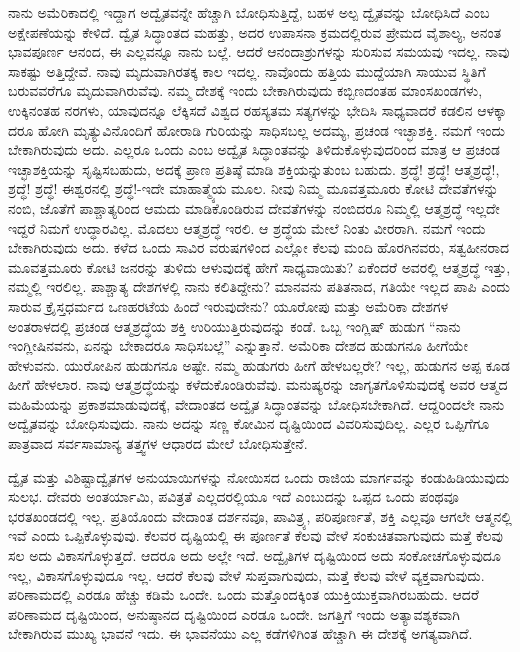 ನಾನು ಅಮೆರಿಕಾದಲ್ಲಿ ಇದ್ದಾಗ ಅದ್ವೈತವನ್ನೇ ಹೆಚ್ಚಾಗಿ ಬೋಧಿಸುತ್ತಿದ್ದೆ, ಬಹಳ ಅಲ್ಪ ದ್ವೈತವನ್ನು ಬೋಧಿಸಿದೆ ಎಂಬ ಅಕ್ಷೇಪಣೆಯನ್ನು ಕೇಳಿದೆ. ದ್ವೈತ ಸಿದ್ಧಾಂತದ ಮಹತ್ತು, ಅದರ ಉಪಾಸನಾ ಕ್ರಮದಲ್ಲಿರುವ ಪ್ರೇಮದ ವೈಶಾಲ್ಯ, ಅನಂತ ಭಾವಪೂರ್ಣ ಆನಂದ, ಈ ಎಲ್ಲವನ್ನೂ ನಾನು ಬಲ್ಲೆ. ಆದರೆ ಆನಂದಾಶ್ರುಗಳನ್ನು ಸುರಿಸುವ ಸಮಯವು ಇದಲ್ಲ. ನಾವು ಸಾಕಷ್ಟು ಅತ್ತಿದ್ದೇವೆ. ನಾವು ಮೃದುವಾಗಿರತಕ್ಕ ಕಾಲ ಇದಲ್ಲ. ನಾವೊಂದು ಹತ್ತಿಯ ಮುದ್ದೆಯಾಗಿ ಸಾಯುವ ಸ್ಥಿತಿಗೆ ಬರುವವರೆಗೂ ಮೃದುವಾಗಿರುವೆವು. ನಮ್ಮ ದೇಶಕ್ಕೆ ಇಂದು ಬೇಕಾಗಿರುವುದು ಕಬ್ಬಿಣದಂತಹ ಮಾಂಸಖಂಡಗಳು, ಉಕ್ಕಿನಂತಹ ನರಗಳು, ಯಾವುದನ್ನೂ ಲೆಕ್ಕಿಸದೆ ವಿಶ್ವದ ರಹಸ್ಯತಮ ಸತ್ಯಗಳನ್ನು ಭೇದಿಸಿ ಸಾಧ್ಯವಾದರೆ ಕಡಲಿನ ಆಳಕ್ಕಾ ದರೂ ಹೋಗಿ ಮೃತ್ಯುವಿನೊಂದಿಗೆ ಹೋರಾಡಿ ಗುರಿಯನ್ನು ಸಾಧಿಸಬಲ್ಲ ಅದಮ್ಯ, ಪ್ರಚಂಡ ಇಚ್ಛಾಶಕ್ತಿ. ನಮಗೆ ಇಂದು ಬೇಕಾಗಿರುವುದು ಅದು. ಎಲ್ಲರೂ ಒಂದು ಎಂಬ ಅದ್ವೈತ ಸಿದ್ಧಾಂತವನ್ನು ತಿಳಿದುಕೊಳ್ಳುವುದರಿಂದ ಮಾತ್ರ ಆ ಪ್ರಚಂಡ ಇಚ್ಛಾಶಕ್ತಿಯನ್ನು ಸೃಷ್ಟಿಸಬಹುದು, ಅದಕ್ಕೆ ಪ್ರಾಣ ಪ್ರತಿಷ್ಠೆ ಮಾಡಿ ಶಕ್ತಿಯನ್ನುತುಂಬ ಬಹುದು. ಶ್ರದ್ಧೆ! ಶ್ರದ್ಧೆ! ಆತ್ಮಶ್ರದ್ಧೆ!, ಶ್ರದ್ಧೆ! ಶ್ರದ್ಧೆ! ಈಶ್ವರನಲ್ಲಿ ಶ್ರದ್ಧೆ!-ಇದೇ ಮಾಹಾತ್ಮ್ಯೆಯ ಮೂಲ. ನೀವು ನಿಮ್ಮ ಮೂವತ್ತಮೂರು ಕೋಟಿ ದೇವತೆಗಳನ್ನು ನಂಬಿ, ಜೊತೆಗೆ ಪಾಶ್ಚಾತ್ಯರಿಂದ ಆಮದು ಮಾಡಿಕೊಂಡಿರುವ ದೇವತೆಗಳನ್ನು ನಂಬಿದರೂ ನಿಮ್ಮಲ್ಲಿ ಆತ್ಮಶ್ರದ್ಧೆ ಇಲ್ಲದೇ ಇದ್ದರೆ ನಿಮಗೆ ಉದ್ಧಾರವಿಲ್ಲ. ಮೊದಲು ಆತ್ಮಶ್ರದ್ಧೆ ಇರಲಿ. ಆ ಶ್ರದ್ಧೆಯ ಮೇಲೆ ನಿಂತು ವೀರರಾಗಿ. ನಮಗೆ ಇಂದು ಬೇಕಾಗಿರುವುದು ಅದು. ಕಳೆದ ಒಂದು ಸಾವಿರ ವರುಷಗಳಿಂದ ಎಲ್ಲೋ ಕೆಲವು ಮಂದಿ ಹೊರಗಿನವರು, ಸತ್ವಹೀನರಾದ ಮೂವತ್ತಮೂರು ಕೋಟಿ ಜನರನ್ನು ತುಳಿದು ಆಳುವುದಕ್ಕೆ ಹೇಗೆ ಸಾಧ್ಯವಾಯಿತು? ಏಕೆಂದರೆ ಅವರಲ್ಲಿ ಆತ್ಮಶ್ರದ್ಧೆ ಇತ್ತು, ನಮ್ಮಲ್ಲಿ ಇರಲಿಲ್ಲ. ಪಾಶ್ಚಾತ್ಯ ದೇಶಗಳಲ್ಲಿ ನಾನು ಕಲಿತಿದ್ದೇನು? ಮಾನವನು ಪತಿತನಾದ, ಗತಿಯೇ ಇಲ್ಲದ ಪಾಪಿ ಎಂದು ಸಾರುವ ಕ್ರೈಸ್ತಧರ್ಮದ ಒಣಹರಟೆಯ ಹಿಂದೆ ಇರುವುದೇನು? ಯೂರೋಪು ಮತ್ತು ಅಮೆರಿಕಾ ದೇಶಗಳ ಅಂತರಾಳದಲ್ಲಿ ಪ್ರಚಂಡ ಆತ್ಮಶ್ರದ್ಧೆಯ ಶಕ್ತಿ ಉರಿಯುತ್ತಿರುವುದನ್ನು ಕಂಡೆ. ಒಬ್ಬ ಇಂಗ್ಲಿಷ್​ ಹುಡುಗ “ನಾನು ಇಂಗ್ಲೀಷಿನವನು, ಏನನ್ನು ಬೇಕಾದರೂ ಸಾಧಿಸಬಲ್ಲೆ” ಎನ್ನುತ್ತಾನೆ. ಅಮೆರಿಕಾ ದೇಶದ ಹುಡುಗನೂ ಹೀಗೆಯೇ ಹೇಳುವನು. ಯುರೋಪಿನ ಹುಡುಗನೂ ಅಷ್ಟೇ. ನಮ್ಮ ಹುಡುಗರು ಹೀಗೆ ಹೇಳಬಲ್ಲರೇ? ಇಲ್ಲ, ಹುಡುಗನ ಅಪ್ಪ ಕೂಡ ಹೀಗೆ ಹೇಳಲಾರ. ನಾವು ಆತ್ಮಶ್ರದ್ಧೆಯನ್ನು ಕಳೆದುಕೊಂಡಿರುವೆವು. ಮನುಷ್ಯರನ್ನು ಜಾಗೃತಗೊಳಿಸುವುದಕ್ಕೆ ಅವರ ಆತ್ಮದ ಮಹಿಮೆಯನ್ನು ಪ್ರಕಾಶಮಾಡುವುದಕ್ಕೆ, ವೇದಾಂತದ ಅದ್ವೈತ ಸಿದ್ಧಾಂತವನ್ನು ಬೋಧಿಸಬೇಕಾಗಿದೆ. ಆದ್ದರಿಂದಲೇ ನಾನು ಅದ್ವೈತವನ್ನು ಬೋಧಿಸುವುದು. ನಾನು ಅದನ್ನು ಸಣ್ಣ ಕೋಮಿನ ದೃಷ್ಟಿಯಿಂದ ವಿವರಿಸುವುದಿಲ್ಲ. ಎಲ್ಲರ ಒಪ್ಪಿಗೆಗೂ ಪಾತ್ರವಾದ ಸರ್ವಸಾಮಾನ್ಯ ತತ್ತ್ವಗಳ ಆಧಾರದ ಮೇಲೆ ಬೋಧಿಸುತ್ತೇನೆ.

ದ್ವೈತ ಮತ್ತು ವಿಶಿಷ್ಟಾದ್ವೈತಗಳ ಅನುಯಾಯಿಗಳನ್ನು ನೋಯಿಸದ ಒಂದು ರಾಜಿಯ ಮಾರ್ಗವನ್ನು ಕಂಡುಹಿಡಿಯುವುದು ಸುಲಭ. ದೇವರು ಅಂತರ್ಯಾಮಿ, ಪವಿತ್ರತೆ ಎಲ್ಲದರಲ್ಲಿಯೂ ಇದೆ ಎಂಬುದನ್ನು ಒಪ್ಪದ ಒಂದು ಪಂಥವೂ ಭರತಖಂಡದಲ್ಲಿ ಇಲ್ಲ. ಪ್ರತಿಯೊಂದು ವೇದಾಂತ ದರ್ಶನವೂ, ಪಾವಿತ್ರ್ಯ, ಪರಿಪೂರ್ಣತೆ, ಶಕ್ತಿ ಎಲ್ಲವೂ ಆಗಲೇ ಆತ್ಮನಲ್ಲಿ ಇವೆ ಎಂದು ಒಪ್ಪಿಕೊಳ್ಳುವುವು. ಕೆಲವರ ದೃಷ್ಟಿಯಲ್ಲಿ ಈ ಪೂರ್ಣತೆ ಕೆಲವು ವೇಳೆ ಸಂಕುಚಿತವಾಗುವುದು ಮತ್ತೆ ಕೆಲವು ಸಲ ಅದು ವಿಕಾಸಗೊಳ್ಳುತ್ತದೆ. ಆದರೂ ಅದು ಅಲ್ಲೇ ಇದೆ. ಅದ್ವೈತಿಗಳ ದೃಷ್ಟಿಯಿಂದ ಅದು ಸಂಕೋಚಗೊಳ್ಳುವುದೂ ಇಲ್ಲ, ವಿಕಾಸಗೊಳ್ಳುವುದೂ ಇಲ್ಲ. ಆದರೆ ಕೆಲವು ವೇಳೆ ಸುಪ್ತವಾಗುವುದು, ಮತ್ತೆ ಕೆಲವು ವೇಳೆ ವ್ಯಕ್ತವಾಗುವುದು. ಪರಿಣಾಮದಲ್ಲಿ ಎರಡೂ ಹೆಚ್ಚು ಕಡಿಮೆ ಒಂದೇ. ಒಂದು ಮತ್ತೊಂದಕ್ಕಿಂತ ಯುಕ್ತಿಯುಕ್ತವಾಗಿರಬಹುದು. ಆದರೆ ಪರಿಣಾಮದ ದೃಷ್ಟಿಯಿಂದ, ಅನುಷ್ಠಾನದ ದೃಷ್ಟಿಯಿಂದ ಎರಡೂ ಒಂದೇ. ಜಗತ್ತಿಗೆ ಇಂದು ಅತ್ಯಾವಶ್ಯಕವಾಗಿ ಬೇಕಾಗಿರುವ ಮುಖ್ಯ ಭಾವನೆ ಇದು. ಈ ಭಾವನೆಯು ಎಲ್ಲ ಕಡೆಗಳಿಗಿಂತ ಹೆಚ್ಚಾಗಿ ಈ ದೇಶಕ್ಕೆ ಅಗತ್ಯವಾಗಿದೆ.

